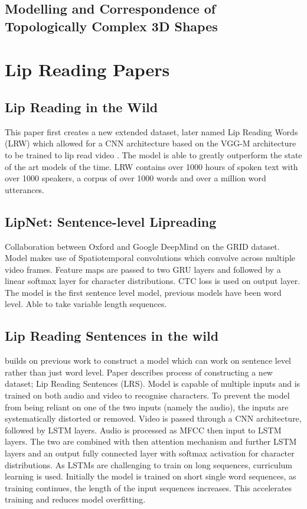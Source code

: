 \documentclass[12pt]{article}
\begin{document}
\subsection{Modelling and Correspondence of Topologically Complex 3D Shapes}
\cite{Alhashim2015}


\section{Lip Reading Papers}
\subsection{Lip Reading in the Wild}
This paper first creates a new extended dataset, later named Lip Reading Words (LRW) which allowed for a CNN architecture based on the VGG-M architecture to be trained to lip read video \cite{Chung2016}.
The model is able to greatly outperform the state of the art models of the time.
LRW contains over 1000 hours of spoken text with over 1000 speakers, a corpus of over 1000 words and over a million word utterances.

\subsection{LipNet: Sentence-level Lipreading}
Collaboration between Oxford and Google DeepMind \cite{Assael2016} on the GRID dataset.
Model makes use of Spatiotemporal convolutions which convolve across multiple video frames.
Feature maps are passed to two GRU layers and followed by a linear softmax layer for character distributions.
CTC loss is used on output layer.
The model is the first sentence level model, previous models have been word level.
Able to take variable length sequences.

\subsection{Lip Reading Sentences in the wild}
\cite{Chung2017} builds on previous work to construct a model which can work on sentence level rather than just word level.
Paper describes process of constructing a new dataset; Lip Reading Sentences (LRS).
Model is capable of multiple inputs and is trained on both audio and video to recognise characters.
To prevent the model from being reliant on one of the two inputs (namely the audio), the inputs are systematically distorted or removed.
Video is passed through a CNN architecture, followed by LSTM layers.
Audio is processed as MFCC then input to LSTM layers.
The two are combined with then attention mechanism and further LSTM layers and an output fully connected layer with softmax activation for character distributions.
As LSTMs are challenging to train on long sequences, curriculum learning is used.
Initially the model is trained on short single word sequences, as training continues, the length of the input sequences increases.
This accelerates training and reduces model overfitting.
\end{document}
